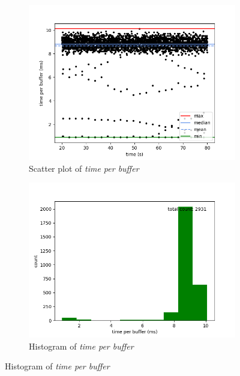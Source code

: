 \begin{figure}[H]
    \centering

    \begin{subfigure}[t]{0.5\textwidth}
        \centering
        \includegraphics[scale=0.45]{img/trace_no_wait_per_buffer_scatter.png}
        \caption{Scatter plot of \textit{time per buffer}}
    \end{subfigure}%
    \begin{subfigure}[t]{0.5\textwidth}
        \centering
        \includegraphics[scale=0.45]{img/trace_no_wait_per_buffer_hist.png}
        \caption{Histogram of \textit{time per buffer}}
    \end{subfigure}


\end{figure}
